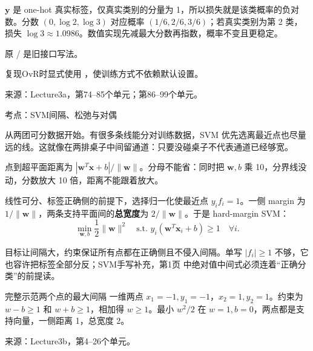 \(\mathbf y\) 是 one-hot 真实标签，仅真实类别的分量为 1，所以损失就是该类概率的负对数。分数 \((0,\log2,\log3)\) 对应概率 \((1/6,2/6,3/6)\)；若真实类别为第 2 类，损失 \(\log3\approx1.0986\)。数值实现先减最大分数再指数，概率不变且更稳定。


原  /  是旧接口写法。

复现OvR时显式使用 ，使训练方式不依赖默认设置。


来源：Lecture3a，第74–85个单元；第86–99个单元。








考点：SVM间隔、松弛与对偶
 

从两团可分数据开始。有很多条线能分对训练数据，SVM 优先选离最近点也尽量远的线。这就像在两排桌子中间留通道：只要没碰桌子不代表通道已经够宽。


点到超平面距离为 \(|\mathbf w^T\mathbf x+b|/\|\mathbf w\|\)。分母不能省：同时把 \(\mathbf w,b\) 乘 10，分界线没动，分数放大 10 倍，距离不能跟着放大。


线性可分、标签正确侧的前提下，选择归一化使最近点 \(y_if_i=1\)。一侧 margin 为 \(1/\|\mathbf w\|\)，两条支持平面间的\textbf{总宽度}为 \(2/\|\mathbf w\|\)。于是 hard-margin SVM：
\[
\min_{\mathbf w,b}\frac12\|\mathbf w\|^2\quad\text{s.t. } y_i(\mathbf w^T\mathbf x_i+b)\ge1\quad\forall i.\tag{3.8}
\]


目标让间隔大，约束保证所有点都在正确侧且不侵入间隔。单写 \(|f_i|\ge1\) 不够，它也容许把标签全部分反；SVM手写补充，第1页 中绝对值中间式必须连着“正确分类”的前提读。


\begin{StudyBlock}{完整示范}{两个点的最大间隔}
一维两点 \(x_1=-1,y_1=-1\)，\(x_2=1,y_2=1\)。约束为 \(w-b\ge1\) 和 \(w+b\ge1\)，相加得 \(w\ge1\)。最小 \(w^2/2\) 在 \(w=1,b=0\)，两点都是支持向量，一侧距离 1，总宽度 2。
\end{StudyBlock}


来源：Lecture3b，第4–26个单元。






